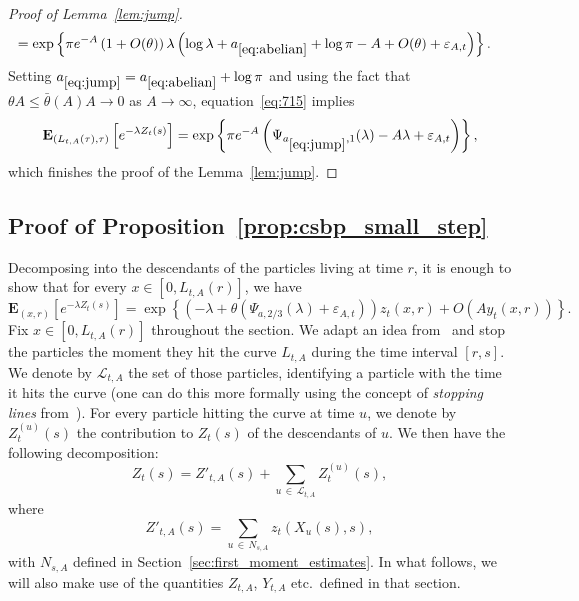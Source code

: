 \documentclass[10pt]{amsart}
\theoremstyle{definition}\newtheorem{defi}[theo]{Definition}\newtheorem{rema}[theo]{Remark}\newtheorem{exam}[theo]{Example}\newtheorem{exem}[theo]{Example}\newtheorem{nota}[theo]{Notation}
\newcommand*\eps{\varepsilon}
\newcommand*\E{\mathbf{E}}
\renewcommand{\L}{\mathcal{L}}
\newcommand{\1} {\mathds{1}}
\renewcommand*\to{\rightarrow}
\begin{document}
\begin{proof}[Proof of Lemma~\ref{lem:jump}]
\begin{multline}
\begin{aligned}
&= \exp\left\{\pi e^{-A} \left(1+O(\theta)\right)\lambda\left(\log \lambda + a_{\eqref{eq:abelian}} + \log \pi -A + O(\theta) + \eps_{A,t}\right)\right\}.
\end{aligned}
\end{multline}
Setting $a_{\eqref{eq:jump}} = a_{\eqref{eq:abelian}} + \log \pi$ and using the fact that $\theta A \le \bar\theta(A) A \to 0$ as $A\to\infty$, equation~\eqref{eq:715} implies
\begin{equation}\label{eq:716}
\E_{\left(L_{t,A}(\tau),\tau\right)}\left[e^{-\lambda Z_t(s)}\right] = \exp\left\{\pi e^{-A}\left(\Psi_{a_{\eqref{eq:jump}},1}(\lambda) -A\lambda + \eps_{A,t}\right)\right\},
\end{equation}
which finishes the proof of the Lemma~\ref{lem:jump}.
\end{proof}

\subsection{Proof of Proposition~\ref{prop:csbp_small_step}}\label{sec:csbp_small_step}

Decomposing into the descendants of the particles living at time $r$, it is enough to show that for every $x\in[0,L_{t,A}(r)]$, we have
\begin{equation}\label{eq:720}
\E_{(x,r)}\left[e^{-\lambda Z_t(s)}\right] = \exp\left\{\left(-\lambda + \theta\left(\Psi_{a,2/3}(\lambda)+\eps_{A,t}\right)\right)z_t(x,r) + O\left(Ay_t(x,r)\right)\right\}.
\end{equation}
Fix $x\in[0,L_{t,A}(r)]$ throughout the section. We adapt an idea from~\cite{bbs2} and stop the particles the moment they hit the curve $L_{t,A}$ during the time interval $[r,s]$. We denote by $\L_{t,A}$ the set of those particles, identifying a particle with the time it hits the curve (one can do this more formally using the concept of \emph{stopping lines} from~\cite{chauvin91}). For every particle hitting the curve at time $u$, we denote by $Z_t^{(u)}(s)$ the contribution to $Z_t(s)$ of the descendants of $u$. We then have the following decomposition:
\begin{equation}\label{master decomposition}
Z_t(s) = Z'_{t,A}(s)+\sum_{u\,\in\,\L_{t,A}}Z_t^{(u)}(s),
\end{equation}
where
\[
Z'_{t,A}(s) = \sum_{u\,\in\,N_{s,A}} z_t\left(X_u(s),s\right),
\]
with $N_{s,A}$ defined in Section~\ref{sec:first_moment_estimates}. In what follows, we will also make use of the quantities $Z_{t,A}$, $Y_{t,A}$ etc.~defined in that section.
\end{document}
